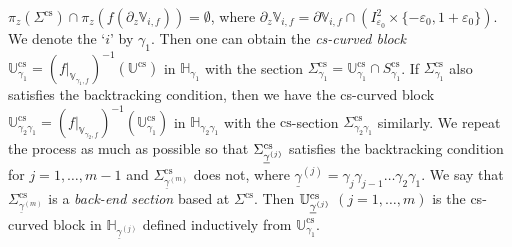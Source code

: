 \documentclass{amsart}
\theoremstyle{definition}
\numberwithin{equation}{section}
\numberwithin{figure}{section}
\begin{document}
$\pi_z(\Sigma^{\mathrm{cs}})\cap \pi_z(f(\partial_z\mathbb{V}_{i,f}))=\emptyset$, where 
$\partial_z \mathbb{V}_{i,f}=\partial\mathbb{V}_{i,f}\cap (I_{\varepsilon_0}^2\times \{-\varepsilon_0,1+\varepsilon_0\})$.
We denote the `$i$' by $\gamma_1$.
Then one can obtain the \emph{cs-curved block} $\mathbb{U}_{\gamma_1}^{\mathrm{cs}}=(f|_{\mathbb{V}_{\gamma_1,f}})^{-1}(\mathbb{U}^{\mathrm{cs}})$ in $\mathbb{H}_{\gamma_1}$ with the 
section $\Sigma_{\gamma_1}^{\mathrm{cs}}=\mathbb{U}_{\gamma_1}^{\mathrm{cs}}\cap S_{\gamma_1}^{\mathrm{cs}}$.
If $\Sigma_{\gamma_1}^{\mathrm{cs}}$ also satisfies the backtracking condition, then we have the cs-curved block 
$\mathbb{U}_{\gamma_2\gamma_1}^{\mathrm{cs}}=(f|_{\mathbb{V}_{\gamma_2,f}})^{-1}(\mathbb{U}_{\gamma_1}^{\mathrm{cs}})$ in $\mathbb{H}_{\gamma_2\gamma_1}$ with the $\mathrm{cs}$-section $\Sigma_{\gamma_2\gamma_1}^{\mathrm{cs}}$ 
similarly.
We repeat the process as much as possible so that $\Sigma_{\underline{\gamma}^{(j)}}^{\mathrm{cs}}\index{Sggcs@$\Sigma_{\underline{\gamma}^{(j)}}^{\mathrm{cs}}$}$ satisfies the 
backtracking condition for $j=1,\dots,m-1$ and $\Sigma_{\underline{\gamma}^{(m)}}^{\mathrm{cs}}$ does not, where 
$\underline{\gamma}^{(j)}=\gamma_j\gamma_{j-1}\dots \gamma_2\gamma_1$.
We say that $\Sigma_{\underline{\gamma}^{(m)}}^{\mathrm{cs}}$ is a \emph{back-end section} based at $\Sigma^{\mathrm{cs}}$.
Then $\mathbb{U}_{\underline{\gamma}^{(j)}}^{\mathrm{cs}}\index{Ucsg@$\mathbb{U}_{\underline{\gamma}^{(j)}}^{\mathrm{cs}}$}$ $(j=1,\dots,m)$ is 
the cs-curved block in $\mathbb{H}_{\underline{\gamma}^{(j)}}$ defined inductively from $\mathbb{U}_{\gamma_1}^{\mathrm{cs}}$.
\end{document}
